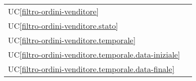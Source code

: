 \begin{longtable}{C{6cm} C{6cm}}
	UC\ref{filtro-ordini-venditore} &  \\

    UC\ref{filtro-ordini-venditore.stato} &  \\

	UC\ref{filtro-ordini-venditore.temporale} &  \\

    UC\ref{filtro-ordini-venditore.temporale.data-iniziale} &  \\

	UC\ref{filtro-ordini-venditore.temporale.data-finale} &  \\


\end{longtable}
